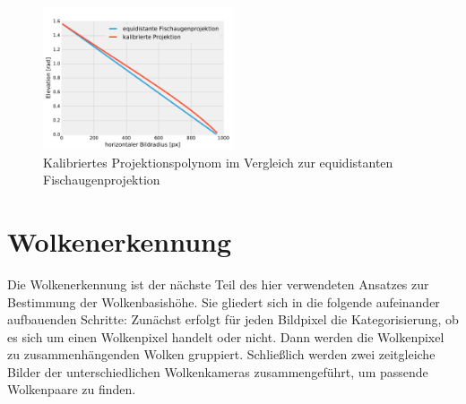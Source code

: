 \documentclass[a4paper,11pt,twoside,german]{article}
\begin{document}
\begin{figure}[!h]
\begin{center}
\vspace{-0.7cm}
\includegraphics[width=0.5\textwidth]{media/projection-calibration.pdf}
\vspace{-0.7cm}
\caption[Kalibrierte Projektionsfunktion]{Kalibriertes Projektionspolynom im
Vergleich zur equidistanten Fischaugenprojektion}
\label{FIGProjektioncalib}
\end{center}
\end{figure}


\section{Wolkenerkennung}
\label{SECWolkenErkennung}
Die Wolkenerkennung ist der nächste Teil des hier verwendeten Ansatzes zur
Bestimmung der Wolkenbasishöhe. Sie gliedert sich in die folgende aufeinander
aufbauenden Schritte: Zunächst erfolgt für jeden Bildpixel die Kategorisierung,
ob es sich um einen Wolkenpixel handelt oder nicht.  Dann werden die
Wolkenpixel zu zusammenhängenden Wolken gruppiert. Schließlich werden zwei
zeitgleiche Bilder der unterschiedlichen Wolkenkameras zusammengeführt, um
passende Wolkenpaare zu finden. 
\end{document}
